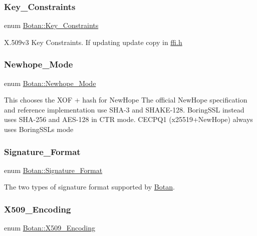 \subsubsection{\texorpdfstring{Key\+\_\+\+Constraints}{Key\_Constraints}}
{\footnotesize\ttfamily enum \hyperlink{namespace_botan_aed0885e5c70627dd43827b966e727654}{Botan\+::\+Key\+\_\+\+Constraints}}

X.\+509v3 Key Constraints. If updating update copy in \hyperlink{ffi_8h_source}{ffi.\+h} \mbox{\label{namespace_botan_a42a70d7cfb95e4f7773d3b52dc98ad61}} 
\subsubsection{\texorpdfstring{Newhope\+\_\+\+Mode}{Newhope\_Mode}}
{\footnotesize\ttfamily enum \hyperlink{namespace_botan_a42a70d7cfb95e4f7773d3b52dc98ad61}{Botan\+::\+Newhope\+\_\+\+Mode}\hspace{0.3cm}{\ttfamily [strong]}}

This chooses the X\+OF + hash for New\+Hope The official New\+Hope specification and reference implementation use S\+H\+A-\/3 and S\+H\+A\+K\+E-\/128. Boring\+S\+SL instead uses S\+H\+A-\/256 and A\+E\+S-\/128 in C\+TR mode. C\+E\+C\+P\+Q1 (x25519+\+New\+Hope) always uses Boring\+S\+SL\textquotesingle{}s mode \mbox{\label{namespace_botan_ad8a9578625edf847cbcba3ae15648cda}} 
\subsubsection{\texorpdfstring{Signature\+\_\+\+Format}{Signature\_Format}}
{\footnotesize\ttfamily enum \hyperlink{namespace_botan_ad8a9578625edf847cbcba3ae15648cda}{Botan\+::\+Signature\+\_\+\+Format}}

The two types of signature format supported by \hyperlink{namespace_botan}{Botan}. \mbox{\label{namespace_botan_a53759b4ed1fb93549f307fcf68729d2f}} 
\subsubsection{\texorpdfstring{X509\+\_\+\+Encoding}{X509\_Encoding}}
{\footnotesize\ttfamily enum \hyperlink{namespace_botan_a53759b4ed1fb93549f307fcf68729d2f}{Botan\+::\+X509\+\_\+\+Encoding}}

